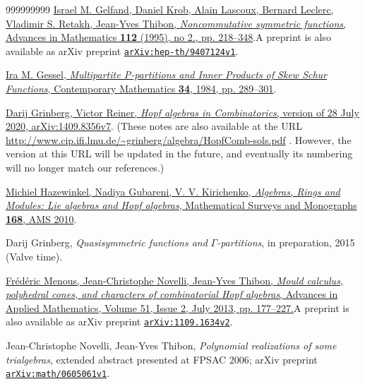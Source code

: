 \documentclass[numbers=enddot,12pt,final,onecolumn,notitlepage,abstracton]{scrartcl}%
\theoremstyle{definition}
\newenvironment{noncompile}{}{}
\begin{document}
\begin{thebibliography}{999999999}
\href{https://doi.org/10.1006/aima.1995.1032}{Israel
M. Gelfand, Daniel Krob, Alain Lascoux, Bernard Leclerc, Vladimir S. Retakh,
Jean-Yves Thibon, \textit{Noncommutative symmetric functions}, Advances in
Mathematics \textbf{112} (1995), no 2., pp. 218--348}.\newline A preprint is
also available as arXiv preprint
\texttt{\href{https://arxiv.org/abs/hep-th/9407124v1}{arXiv:hep-th/9407124v1}}.

%
\href{http://people.brandeis.edu/~gessel/homepage/papers/multipartite.pdf}{Ira
M. Gessel, \textit{Multipartite P-partitions and Inner Products of Skew Schur
Functions}, Contemporary Mathematics \textbf{34}, 1984, pp. 289--301}.

\href{https://arxiv.org/abs/1409.8356v7}{Darij
Grinberg, Victor Reiner, \textit{Hopf algebras in Combinatorics}, version of
28 July 2020, arXiv:1409.8356v7}. \newline(These notes are also available at
the URL \url{http://www.cip.ifi.lmu.de/~grinberg/algebra/HopfComb-sols.pdf} .
However, the version at this URL will be updated in the future, and eventually
its numbering will no longer match our references.)

\href{https://bookstore.ams.org/surv-168}{Michiel
Hazewinkel, Nadiya Gubareni, V. V. Kirichenko, \textit{Algebras, Rings and
Modules: Lie algebras and Hopf algebras}, Mathematical Surveys and Monographs
\textbf{168}, AMS 2010}.

\begin{noncompile}


Darij Grinberg, \textit{Quasisymmetric
functions and }$\Gamma$\textit{-partitions}, in preparation, 2015 (Valve time).
\end{noncompile}

%
\href{https://doi.org/10.1016/j.aam.2013.02.003}{Fr\'{e}d\'{e}ric Menous,
Jean-Christophe Novelli, Jean-Yves Thibon, \textit{Mould calculus, polyhedral
cones, and characters of combinatorial Hopf algebras}, Advances in Applied
Mathematics, Volume 51, Issue 2, July 2013, pp. 177--227.}\newline A preprint
is also available as arXiv preprint
\texttt{\href{https://arxiv.org/abs/1109.1634v2}{arXiv:1109.1634v2}}.

Jean-Christophe Novelli, Jean-Yves Thibon,
\textit{Polynomial realizations of some trialgebras}, extended abstract
presented at FPSAC 2006; arXiv preprint
\texttt{\href{https://arxiv.org/abs/math/0605061v1}{arXiv:math/0605061v1}}.


\end{thebibliography}
\end{document}
